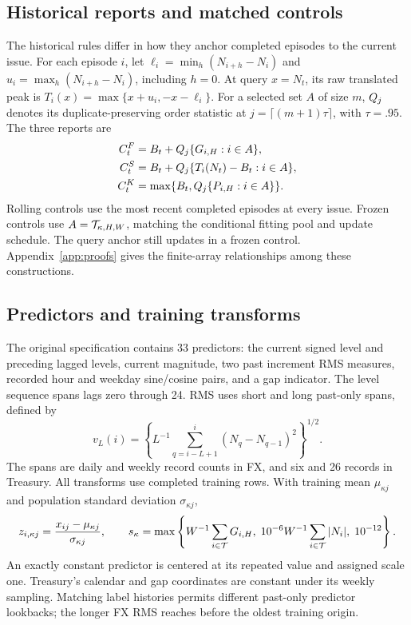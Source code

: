 \subsection{Historical reports and matched controls}
The historical rules differ in how they anchor completed episodes to the current issue. For each episode $i$, let $\ell_i=\min_h(N_{i+h}-N_i)$ and $u_i=\max_h(N_{i+h}-N_i)$, including $h=0$. At query $x=N_t$, its raw translated peak is $T_i(x)=\max\{x+u_i,-x-\ell_i\}$. For a selected set $A$ of size $m$, $Q_j$ denotes its duplicate-preserving order statistic at $j=\lceil(m+1)\tau\rceil$, with $\tau=.95$. The three reports are
\begin{align}\label{eq:historical}
C_t^F&=B_t+Q_j\{G_{i,H}:i\in A\},\nonumber\\
C_t^S&=B_t+Q_j\{T_i(N_t)-B_t:i\in A\},\\
C_t^K&=\max\{B_t,Q_j\{P_{i,H}:i\in A\}\}.\nonumber
\end{align}
Rolling controls use the most recent completed episodes at every issue. Frozen controls use $A=\mathcal T_{\kappa,H,W}$, matching the conditional fitting pool and update schedule. The query anchor still updates in a frozen control. Appendix~\ref{app:proofs} gives the finite-array relationships among these constructions.

\subsection{Predictors and training transforms}
The original specification contains 33 predictors: the current signed level and preceding lagged levels, current magnitude, two past increment RMS measures, recorded hour and weekday sine/cosine pairs, and a gap indicator. The level sequence spans lags zero through 24. RMS uses short and long past-only spans, defined by
\begin{equation}
v_L(i)=\left\{L^{-1}\sum_{q=i-L+1}^{i}(N_q-N_{q-1})^2\right\}^{1/2}.
\end{equation}
The spans are daily and weekly record counts in FX, and six and 26 records in Treasury. All transforms use completed training rows. With training mean $\mu_{\kappa j}$ and population standard deviation $\sigma_{\kappa j}$,
\begin{equation}
z_{i,\kappa j}=\frac{x_{ij}-\mu_{\kappa j}}{\sigma_{\kappa j}},\qquad
s_\kappa=\max\left\{W^{-1}\sum_{i\in\mathcal T}G_{i,H},\;10^{-6}W^{-1}\sum_{i\in\mathcal T}|N_i|,\;10^{-12}\right\}.
\end{equation}
An exactly constant predictor is centered at its repeated value and assigned scale one. Treasury's calendar and gap coordinates are constant under its weekly sampling. Matching label histories permits different past-only predictor lookbacks; the longer FX RMS reaches before the oldest training origin.

